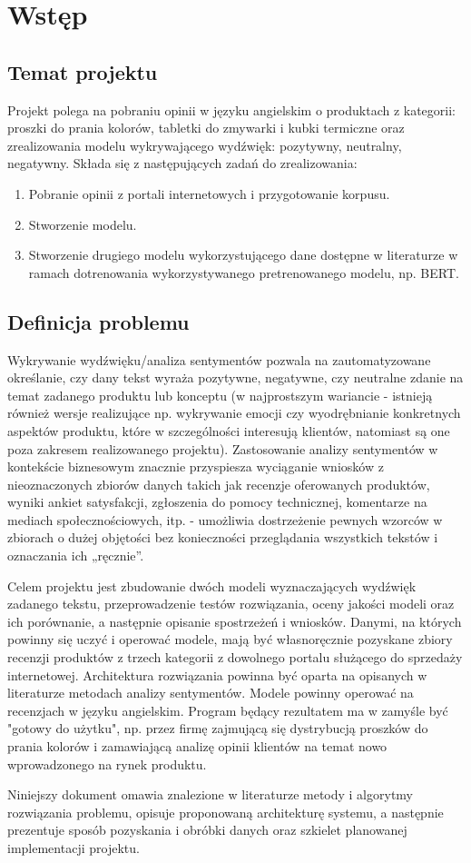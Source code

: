 \newpage
\section{Wstęp}

\subsection{Temat projektu}

Projekt polega na pobraniu opinii w języku angielskim o produktach z kategorii: proszki do prania kolorów, tabletki do zmywarki i kubki termiczne oraz zrealizowania modelu wykrywającego wydźwięk: pozytywny, neutralny, negatywny. Składa się z następujących zadań do zrealizowania:
\begin{enumerate}
    \item Pobranie opinii z portali internetowych i przygotowanie korpusu.
    \item Stworzenie modelu.
    \item Stworzenie drugiego modelu wykorzystującego dane dostępne w literaturze w ramach dotrenowania wykorzystywanego pretrenowanego modelu, np. BERT.
\end{enumerate}

\subsection{Definicja problemu}

Wykrywanie wydźwięku/analiza sentymentów pozwala na zautomatyzowane określanie, czy dany tekst wyraża pozytywne, negatywne, czy neutralne zdanie na temat zadanego produktu lub konceptu (w najprostszym wariancie - istnieją również wersje realizujące np. wykrywanie emocji czy wyodrębnianie konkretnych aspektów produktu, które w szczególności interesują klientów, natomiast są one poza zakresem realizowanego projektu). Zastosowanie analizy sentymentów w kontekście biznesowym znacznie przyspiesza wyciąganie wniosków z nieoznaczonych zbiorów danych takich jak recenzje oferowanych produktów, wyniki ankiet satysfakcji, zgłoszenia do pomocy technicznej, komentarze na mediach społecznościowych, itp. - umożliwia dostrzeżenie pewnych wzorców w zbiorach o dużej objętości bez konieczności przeglądania wszystkich tekstów i oznaczania ich „ręcznie”.

Celem projektu jest zbudowanie dwóch modeli wyznaczających wydźwięk zadanego tekstu, przeprowadzenie testów rozwiązania, oceny jakości modeli oraz ich porównanie, a następnie opisanie spostrzeżeń i wniosków. Danymi, na których powinny się uczyć i operować modele, mają być własnoręcznie pozyskane zbiory recenzji produktów z trzech kategorii z dowolnego portalu służącego do sprzedaży internetowej. Architektura rozwiązania powinna być oparta na opisanych w literaturze metodach analizy sentymentów. Modele powinny operować na recenzjach w języku angielskim. Program będący rezultatem ma w zamyśle być "gotowy do użytku", np. przez firmę zajmującą się dystrybucją proszków do prania kolorów i zamawiającą analizę opinii klientów na temat nowo wprowadzonego na rynek produktu.

Niniejszy dokument omawia znalezione w literaturze metody i algorytmy rozwiązania problemu, opisuje proponowaną architekturę systemu, a następnie prezentuje sposób pozyskania i obróbki danych oraz szkielet planowanej implementacji projektu.
